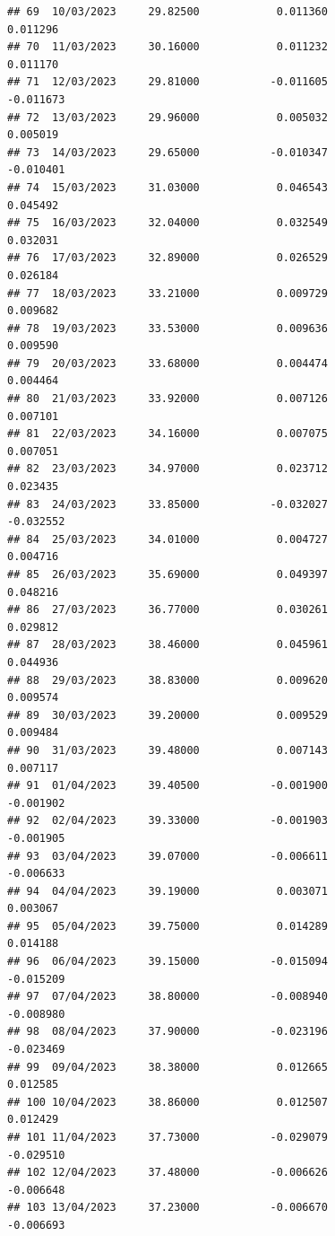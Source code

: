\documentclass[
]{article}
\begin{document}
\begin{verbatim}
## 69  10/03/2023     29.82500            0.011360                0.011296
## 70  11/03/2023     30.16000            0.011232                0.011170
## 71  12/03/2023     29.81000           -0.011605               -0.011673
## 72  13/03/2023     29.96000            0.005032                0.005019
## 73  14/03/2023     29.65000           -0.010347               -0.010401
## 74  15/03/2023     31.03000            0.046543                0.045492
## 75  16/03/2023     32.04000            0.032549                0.032031
## 76  17/03/2023     32.89000            0.026529                0.026184
## 77  18/03/2023     33.21000            0.009729                0.009682
## 78  19/03/2023     33.53000            0.009636                0.009590
## 79  20/03/2023     33.68000            0.004474                0.004464
## 80  21/03/2023     33.92000            0.007126                0.007101
## 81  22/03/2023     34.16000            0.007075                0.007051
## 82  23/03/2023     34.97000            0.023712                0.023435
## 83  24/03/2023     33.85000           -0.032027               -0.032552
## 84  25/03/2023     34.01000            0.004727                0.004716
## 85  26/03/2023     35.69000            0.049397                0.048216
## 86  27/03/2023     36.77000            0.030261                0.029812
## 87  28/03/2023     38.46000            0.045961                0.044936
## 88  29/03/2023     38.83000            0.009620                0.009574
## 89  30/03/2023     39.20000            0.009529                0.009484
## 90  31/03/2023     39.48000            0.007143                0.007117
## 91  01/04/2023     39.40500           -0.001900               -0.001902
## 92  02/04/2023     39.33000           -0.001903               -0.001905
## 93  03/04/2023     39.07000           -0.006611               -0.006633
## 94  04/04/2023     39.19000            0.003071                0.003067
## 95  05/04/2023     39.75000            0.014289                0.014188
## 96  06/04/2023     39.15000           -0.015094               -0.015209
## 97  07/04/2023     38.80000           -0.008940               -0.008980
## 98  08/04/2023     37.90000           -0.023196               -0.023469
## 99  09/04/2023     38.38000            0.012665                0.012585
## 100 10/04/2023     38.86000            0.012507                0.012429
## 101 11/04/2023     37.73000           -0.029079               -0.029510
## 102 12/04/2023     37.48000           -0.006626               -0.006648
## 103 13/04/2023     37.23000           -0.006670               -0.006693

\end{verbatim}
\end{document}
